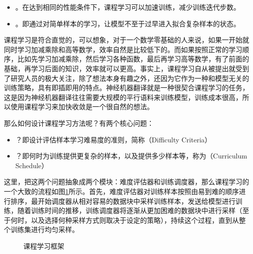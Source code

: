 \begin{itemize}
\vspace{0.5em}
\item {\small{}}。在达到相同的性能条件下，课程学习可以加速训练，减少训练迭代步数。
\vspace{0.5em}
\item {\small{}}。即通过对简单样本的学习，让模型不至于过早进入拟合复杂样本的状态。
\vspace{0.5em}
\end{itemize}

\parinterval 课程学习是符合直觉的，可以想象，对于一个数学零基础的人来说，如果一开始就同时学习加减乘除和高等数学，效率自然是比较低下的。而如果按照正常的学习顺序，比如先学习加减乘除，然后学习各种函数，最后再学习高等数学，有了前面的基础，再学习后面的知识，效率就可以更高。事实上，课程学习自从被提出就受到了研究人员的极大关注，除了想法本身有趣之外，还因为它作为一种和模型无关的训练策略，具有即插即用的特点。神经机器翻译就是一种很契合课程学习的任务，这是因为神经机器翻译往往需要大规模的平行语料来训练模型，训练成本很高，所以使用课程学习来加快收敛是一个很自然的想法。

\parinterval 那么如何设计课程学习方法呢？有两个核心问题：

\begin{itemize}
\vspace{0.5em}
\item {\small{}}？即设计评估样本学习难易度的准则，简称{\small{}}（Difficulty Criteria）
\vspace{0.5em}
\item {\small{}}？即何时为训练提供更复杂的样本，以及提供多少样本等，称为{\small{}}（Curriculum Schedule）
\vspace{0.5em}
\end{itemize}

\parinterval 这里，把这两个问题抽象成两个模块：难度评估器和训练调度器，那么课程学习的一个大致的流程如图\ref{fig:13-14}所示。首先，难度评估器对训练样本按照由易到难的顺序进行排序，最开始调度器从相对容易的数据块中采样训练样本，发送给模型进行训练，随着训练时间的推移，训练调度器将逐渐从更加困难的数据块中进行采样（至于何时，以及选择何种采样方式则取决于设定的策略），持续这个过程，直到从整个训练集进行均匀采样。

\begin{figure}[htp]
\centering

\caption{课程学习框架}
\label{fig:13-14}
\end{figure}

